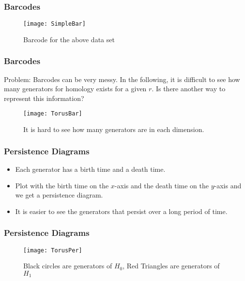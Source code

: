 \begin{frame}
\frametitle{Barcodes}
\begin{figure}
\begin{center}
	\texttt{[image: SimpleBar]}
	\caption{Barcode for the above data set}
\end{center}
\end{figure}
\end{frame}

\begin{frame}
\frametitle{Barcodes}
Problem: Barcodes can be very messy. In the following, it is difficult to see how many generators for homology exists for a given $r$. Is there another way to  represent this information?
\begin{figure}
\begin{center}
	\texttt{[image: TorusBar]}
	\caption{It is hard to see how many generators are in each dimension.}
\end{center}
\end{figure}
\end{frame}

\begin{frame}
\frametitle{Persistence Diagrams}
\begin{itemize}
\item<1-> Each generator has a birth time and a death time.
\item<2-> Plot with the birth time on the $x$-axis and the death time on the $y$-axis and we get a persistence diagram.
\item<3-> It is easier to see the generators that persist over a long period of time.
\end{itemize}
\end{frame}

\begin{frame}
\frametitle{Persistence Diagrams}
\begin{figure}
\begin{center}
	\texttt{[image: TorusPer]}
	\caption{Black circles are generators of $H_0$, Red Triangles are generators of $H_1$}
\end{center}
\end{figure}
\end{frame}

